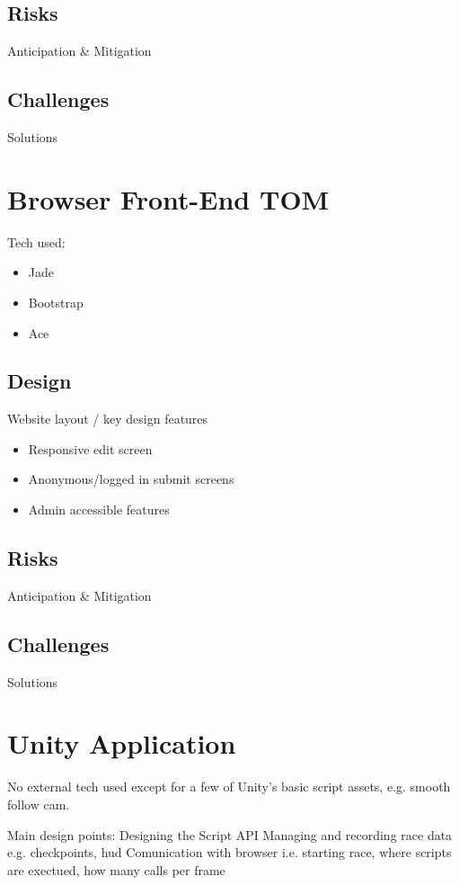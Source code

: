 \subsection{Risks}
Anticipation \& Mitigation

\subsection{Challenges}
Solutions

\section{Browser Front-End {\color{red} TOM}}
Tech used:
\begin{itemize}
\item Jade 
\item Bootstrap
\item Ace
\end{itemize}

\subsection{Design}
Website layout / key design features 
\begin{itemize}
\item Responsive edit screen
\item Anonymous/logged in submit screens
\item Admin accessible features
\end{itemize}

\subsection{Risks}
Anticipation \& Mitigation

\subsection{Challenges}
Solutions

\section{Unity Application}
No external tech used except for a few of Unity's basic script assets, e.g. smooth follow cam.

Main design points:
Designing the Script API
Managing and recording race data e.g. checkpoints, hud
Comunication with browser i.e. starting race, where scripts are exectued, how many calls per frame

